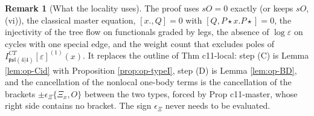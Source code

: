 \documentclass[11pt]{article}
\numberwithin{equation}{section}
\theoremstyle{plain}
\theoremstyle{definition}
\newtheorem{remark}[theorem]{Remark}
\newcommand{\psl}{\mathfrak{psl}(4|4)}
\newcommand{\Pst}{P\star}
\begin{document}
\begin{remark}[What the locality uses]
\label{rem:op-localuses}
The proof uses $sO=0$ exactly (or keeps $sO$, (vi)), the classical master equation, $[x.,Q]=0$ with $[Q,\Pst x.\Pst]=0$, the injectivity of the tree flow on functionals graded by legs, the absence of $\log\varepsilon$ on cycles with one special edge, and the weight count that excludes poles of $I^{CT}_{\psl}[\varepsilon]^{(1)}(x)$. It replaces the outline of Thm c11-local: step (C) is Lemma \ref{lem:op-Cid} with Proposition \ref{prop:op-typeI}, step (D) is Lemma \ref{lem:op-BD}, and the cancellation of the nonlocal one-body terms is the cancellation of the brackets $\pm\epsilon_\Xi\{\Xi_x,O\}$ between the two types, forced by Prop c11-master, whose right side contains no bracket. The sign $\epsilon_\Xi$ never needs to be evaluated.
\end{remark}
\end{document}
